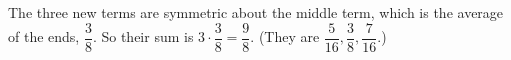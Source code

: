 The three new terms are symmetric about the middle term, which is the average of the ends, $\dfrac{3}{8}$. So their sum is $3\cdot\dfrac{3}{8}=\boxed{\dfrac{9}{8}}$. (They are $\dfrac{5}{16},\dfrac{3}{8},\dfrac{7}{16}$.)
